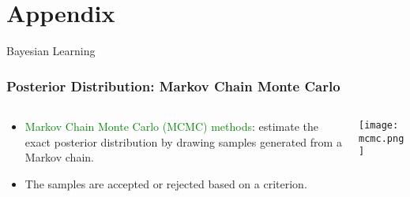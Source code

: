 \section{Appendix}


\begin{frame}{Bayesian Learning}
    \frametitle{Posterior Distribution: Markov Chain Monte Carlo}
    \begin{columns}
      \begin{column}{0.45\linewidth}
        \begin{itemize}
          \item \textcolor{green}{Markov Chain Monte Carlo (MCMC) methods}: estimate the
          exact posterior distribution by drawing samples generated from a Markov
          chain.
          \item The samples are accepted or rejected based on a criterion. 
        \end{itemize}
      \end{column}
      \begin{column}{0.55\linewidth}
        \texttt{[image: mcmc.png]}
      \end{column}
    \end{columns}
\end{frame}

